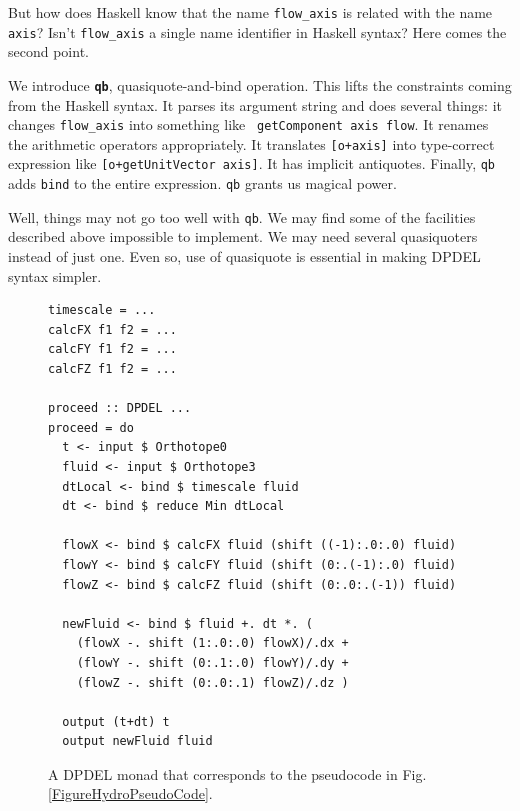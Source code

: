 \documentclass[twocolumn]{article}
\begin{document}
But how does Haskell know that the name {\tt flow\_axis} is related with the
name {\tt axis}? Isn't {\tt flow\_axis} a single name identifier in Haskell
syntax? Here comes the second point.

We introduce {\bf \tt qb}, quasiquote-and-bind operation. This lifts the
constraints coming from the Haskell syntax. It parses its argument string and
does several things: it changes {\tt flow\_axis} into something like {\tt
  getComponent axis flow}. It renames the arithmetic operators
appropriately. It translates {\tt [o+axis]} into type-correct expression like
{\tt [o+getUnitVector axis]}. It has implicit antiquotes. Finally, {\tt qb}
adds {\tt bind} to the entire expression. {\tt qb} grants us magical power.

Well, things may not go too well with {\tt qb}. We may find some of the
facilities described above impossible to implement. We may need several
quasiquoters instead of just one. Even so, use of quasiquote is essential in
making DPDEL syntax simpler.

\begin{figure}
\begin{verbatim}
timescale = ...
calcFX f1 f2 = ...
calcFY f1 f2 = ...
calcFZ f1 f2 = ...

proceed :: DPDEL ...
proceed = do
  t <- input $ Orthotope0
  fluid <- input $ Orthotope3
  dtLocal <- bind $ timescale fluid
  dt <- bind $ reduce Min dtLocal

  flowX <- bind $ calcFX fluid (shift ((-1):.0:.0) fluid)
  flowY <- bind $ calcFY fluid (shift (0:.(-1):.0) fluid)
  flowZ <- bind $ calcFZ fluid (shift (0:.0:.(-1)) fluid)
  
  newFluid <- bind $ fluid +. dt *. (
    (flowX -. shift (1:.0:.0) flowX)/.dx +
    (flowY -. shift (0:.1:.0) flowY)/.dy +
    (flowZ -. shift (0:.0:.1) flowZ)/.dz )

  output (t+dt) t
  output newFluid fluid

\end{verbatim}
\caption{A DPDEL monad that corresponds to the pseudocode in
  Fig. \ref{FigureHydroPseudoCode}.}\label{FigureDPDEL1}
\end{figure}
\end{document}

